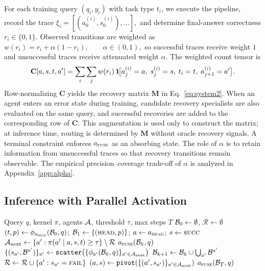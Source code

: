 For each training query $(q_i,y_i)$ with task type $t_i$, we execute the pipeline, record the trace
$
\xi_i=[(a^{(i)}_0,s^{(i)}_0),\ldots],
$
and determine final-answer correctness $r_i \in \{0,1\}$.
Observed transitions are weighted as
$
w(r_i)=r_i+\alpha(1-r_i), \qquad \alpha \in (0,1),
$
so successful traces receive weight $1$ and unsuccessful traces receive attenuated weight $\alpha$.
The weighted count tensor is
\begin{equation}
\label{eq:count_tensor}
\mathbf{C}[a,s,t,a']
=
\sum_i \sum_j
w(r_i)\,
\mathbf{1}\!\bigl[a^{(i)}_j=a,\; s^{(i)}_j=s,\; t_i=t,\; a^{(i)}_{j+1}=a'\bigr].
\end{equation}
Row-normalizing $\mathbf{C}$ yields the recovery matrix $\mathbf{M}$ in Eq.~\ref{eq:system2}.
When an agent enters an error state during training, candidate recovery specialists are also evaluated on the same query, and successful recoveries are added to the corresponding row of $\mathbf{C}$.
This augmentation is used only to construct the matrix; at inference time, routing is determined by $\mathbf{M}$ without oracle recovery signals.
A terminal constraint enforces $a_{\textnormal{\textsc{fuse}}}$ as an absorbing state. The role of $\alpha$ is to retain information from unsuccessful traces so that recovery transitions remain observable.
The empirical precision--coverage trade-off of $\alpha$ is analyzed in Appendix~\ref{app:alpha}.



\subsection{Inference with Parallel Activation}
\begin{algorithm}[!htbp]
\caption{\starname{} inference}
\label{alg:execution}
\small
\begin{algorithmic}[1]
\REQUIRE Query $q$, kernel $\pi$, agents $\mathcal{A}$, threshold $\tau$, max steps $T$
\STATE $\mathcal{B}_0 \gets \emptyset$, \; $\mathcal{R} \gets \emptyset$
\STATE $(t,p)\gets \phi_{a_{\textnormal{\textsc{head}}}}(\mathcal{B}_0,q)$; \; $\mathcal{B}_1\gets \{(\textnormal{\textsc{head}},p)\}$; \; $a\gets a_{\textnormal{\textsc{head}}}$; \; $s\gets \textnormal{\textsc{succ}}$
    \STATE $\mathcal{A}_{\text{next}} \gets \{a' : \pi(a' \mid a,s,t)\ge \tau\} \setminus \mathcal{R}$
        \RETURN $a_{\textnormal{\textsc{fuse}}}(\mathcal{B}_k,q)$
    \ENDIF
    \STATE $\{(s_{a'},\mathcal{B}^{a'})\}_{a'} \gets \texttt{scatter}\bigl(\{\phi_{a'}(\mathcal{B}_k,q)\}_{a'\in\mathcal{A}_{\text{next}}}\bigr)$
    \STATE $\mathcal{B}_{k+1}\gets \mathcal{B}_k \cup \bigcup_{a'} \mathcal{B}^{a'}$
    \STATE $\mathcal{R}\gets \mathcal{R}\cup\{a' : s_{a'}=\textnormal{\textsc{fail}}\}$
    \STATE $(a,s)\gets \texttt{pivot}(\{(a',s_{a'})\}_{a'\in\mathcal{A}_{\text{next}}})$
\ENDFOR
\RETURN $a_{\textnormal{\textsc{fuse}}}(\mathcal{B}_T,q)$
\end{algorithmic}
\end{algorithm}
\vspace{-1.0em}


